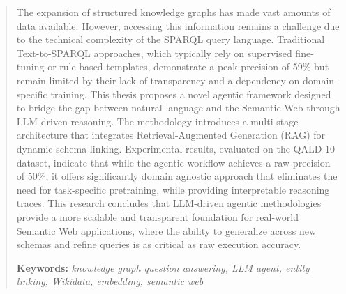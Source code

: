 \newpage
{}
\setcounter{page}{2}

\renewcommand{\abstractname}{\large Abstract}
\addcontentsline{toc}{section}{\abstractname}


\begin{abstract}

     The expansion of structured knowledge graphs has made vast amounts of data available. However, accessing this information remains a challenge due to the technical complexity of the SPARQL query language. Traditional Text-to-SPARQL approaches, which typically rely on supervised fine-tuning or rule-based templates, demonstrate a peak precision of 59\% but remain limited by their lack of transparency and a dependency on domain-specific training. This thesis proposes a novel agentic framework designed to bridge the gap between natural language and the Semantic Web through LLM-driven reasoning. The methodology introduces a multi-stage architecture that integrates Retrieval-Augmented Generation (RAG) for dynamic schema linking. Experimental results, evaluated on the QALD-10 dataset, indicate that while the agentic workflow achieves a raw precision of 50\%, it offers significantly domain agnostic approach that eliminates the need for task-specific pretraining, while providing interpretable reasoning traces. This research concludes that LLM-driven agentic methodologies provide a more scalable and transparent foundation for real-world Semantic Web applications, where the ability to generalize across new schemas and refine queries is as critical as raw execution accuracy.

    \textbf{Keywords:} \textit{knowledge graph question answering, LLM agent, entity linking, Wikidata, embedding, semantic web}
\end{abstract}
